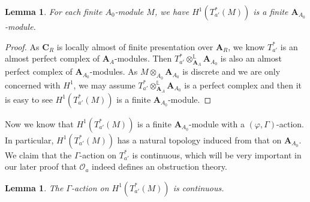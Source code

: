 \documentclass[10pt]{article}
\newtheorem{lem}[thm]{Lemma}
\numberwithin{equation}{section}
\newcommand{\bL}{{\mathbb L}}
\newcommand{\calO}{{\mathcal O}}
\newcommand{\bfA}{{\textbf{A}}}
\newcommand{\bfC}{{\textbf{C}}}
\begin{document}
\begin{lem}
    For each finite $A_0$-module $M$, we have $H^1(T^*_{a'}(M))$ is a finite $\bfA_{A_0}$-module.
\end{lem}
\begin{proof}
    As $\bfC_R$ is locally almost of finite presentation over $\bfA_R$, we know $T^*_{a'}$ is an almost perfect complex of $\bfA_A$-modules. Then 
$T^*_{a'}\otimes^{\bL}_{\bfA_A}\bfA_{A_0}$ is also an almost perfect complex of $\bfA_{A_0}$-modules. As $M\otimes_{A_0}\bfA_{A_0}$ is discrete and we are only concerned with $H^1$, we may assume $T^*_{a'}\otimes^{\bL}_{\bfA_A}\bfA_{A_0}$ is a perfect complex and then it is easy to see $H^1(T^*_{a'}(M))$ is a finite $\bfA_{A_0}$-module.
\end{proof}


Now we know that $H^1(T^*_{a'}(M))$ is a finite $\bfA_{A_0}$-module with a $(\varphi,\Gamma)$-action. In particular, $H^1(T^*_{a'}(M))$ has a natural topology induced from that on $\bfA_{A_0}$. We claim that the $\Gamma$-action on $T^*_{a'}$ is continuous, which will be very important in our later proof that $\calO_a$ indeed defines an obstruction theory.


\begin{lem}\label{continuity}
    The $\Gamma$-action on $H^1(T^*_{a'}(M))$ is continuous.
\end{lem}
\end{document}
